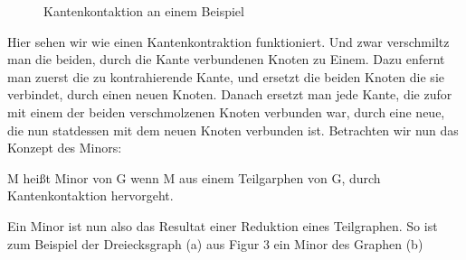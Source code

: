\documentclass[runningheads]{llncs}
\begin{document}
\begin{figure}
    \begin{subfigure}{.24\textwidth}
        \centering
    \end{subfigure}
    \caption{Kantenkontaktion an einem Beispiel}
\end{figure}

Hier sehen wir wie einen Kantenkontraktion funktioniert. Und zwar verschmiltz man die beiden, durch die Kante 
verbundenen Knoten zu Einem. Dazu enfernt man zuerst die zu kontrahierende Kante, und ersetzt die beiden Knoten die sie 
verbindet, durch einen neuen Knoten. Danach ersetzt man jede Kante, die zufor mit einem der beiden verschmolzenen Knoten 
verbunden war, durch eine neue, die nun statdessen mit dem neuen Knoten verbunden ist. Betrachten wir nun das Konzept des
Minors:
\begin{definition}[Minor]
    M heißt Minor von G wenn M aus einem Teilgarphen von G, durch Kantenkontaktion hervorgeht.
\end{definition}
Ein Minor ist nun also das Resultat einer Reduktion eines Teilgraphen.
So ist zum Beispiel der Dreiecksgraph (a) aus Figur 3 ein Minor des Graphen (b)
\end{document}
